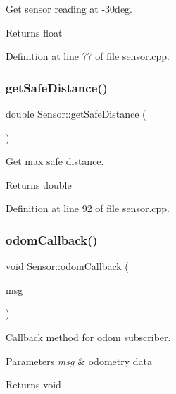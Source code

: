 Get sensor reading at -\/30deg. 

\begin{DoxyReturn}{Returns}
float 
\end{DoxyReturn}


Definition at line 77 of file sensor.\+cpp.

\mbox{\label{class_sensor_a1b7aad1c82fa6df205b166b311f45447}} 
\subsubsection{\texorpdfstring{get\+Safe\+Distance()}{getSafeDistance()}}
{\footnotesize\ttfamily double Sensor\+::get\+Safe\+Distance (\begin{DoxyParamCaption}{ }\end{DoxyParamCaption})}



Get max safe distance. 

\begin{DoxyReturn}{Returns}
double 
\end{DoxyReturn}


Definition at line 92 of file sensor.\+cpp.

\mbox{\label{class_sensor_a69dc2c8fc57c2b421913fda9b1e19fbc}} 
\subsubsection{\texorpdfstring{odom\+Callback()}{odomCallback()}}
{\footnotesize\ttfamily void Sensor\+::odom\+Callback (\begin{DoxyParamCaption}\item[{const nav\+\_\+msgs\+::\+Odometry\+::\+Const\+Ptr \&}]{msg }\end{DoxyParamCaption})}



Callback method for odom subscriber. 


\begin{DoxyParams}{Parameters}
{\em msg} & odometry data \\
\hline
\end{DoxyParams}
\begin{DoxyReturn}{Returns}
void 
\end{DoxyReturn}


